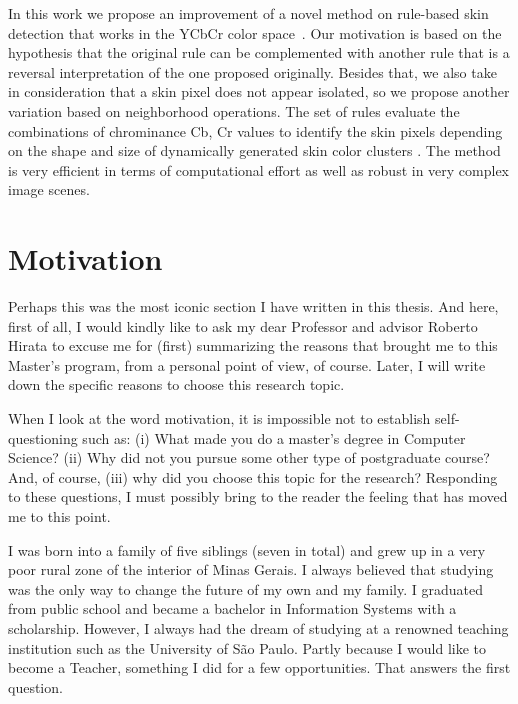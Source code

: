 In this work we propose an improvement of a novel method on rule-based skin detection that works in the YCbCr color space~\citep{brancati:17}. Our motivation is based on the hypothesis that the original rule can be complemented with another rule that is a reversal interpretation of the one proposed originally. Besides that, we also take in consideration that a skin pixel does not appear isolated, so we propose another variation based on neighborhood operations. The set of rules evaluate the combinations of chrominance Cb, Cr values to identify the skin pixels depending on the shape and size of dynamically generated skin color clusters \citep{brancati:17}. The method is very efficient in terms of computational effort as well as robust in very complex image scenes.

\section{Motivation}
\label{sec:motivation}

Perhaps this was the most iconic section I have written in this thesis. And here, first of all, I would kindly like to ask my dear Professor and advisor Roberto Hirata to excuse me for (first) summarizing the reasons that brought me to this Master's program, from a personal point of view, of course. Later, I will write down the specific reasons to choose this research topic.

When I look at the word motivation, it is impossible not to establish self-questioning such as: (i) What made you do a master's degree in Computer Science? (ii) Why did not you pursue some other type of postgraduate course? And, of course, (iii) why did you choose this topic for the research? Responding to these questions, I must possibly bring to the reader the feeling that has moved me to this point.

I was born into a family of five siblings (seven in total) and grew up in a very poor rural zone of the interior of Minas Gerais. I always believed that studying was the only way to change the future of my own and my family. I graduated from public school and became a bachelor in Information Systems with a scholarship. However, I always had the dream of studying at a renowned teaching institution such as the University of São Paulo. Partly because I would like to become a Teacher, something I did for a few opportunities. That answers the first question.

